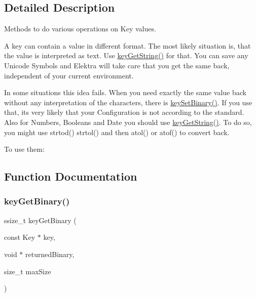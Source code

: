 \subsection{Detailed Description}
Methods to do various operations on Key values. 

A key can contain a value in different format. The most likely situation is, that the value is interpreted as text. Use \mbox{\hyperlink{group__keyvalue_ga41b9fac5ccddafe407fc0ae1e2eb8778}{key\+Get\+String()}} for that. You can save any Unicode Symbols and Elektra will take care that you get the same back, independent of your current environment.

In some situations this idea fails. When you need exactly the same value back without any interpretation of the characters, there is \mbox{\hyperlink{group__keyvalue_gaa50a5358fd328d373a45f395fa1b99e7}{key\+Set\+Binary()}}. If you use that, its very likely that your Configuration is not according to the standard. Also for Numbers, Booleans and Date you should use \mbox{\hyperlink{group__keyvalue_ga41b9fac5ccddafe407fc0ae1e2eb8778}{key\+Get\+String()}}. To do so, you might use strtod() strtol() and then atol() or atof() to convert back.

To use them\+: 
\begin{DoxyCode}{0}
\DoxyCodeLine{\textcolor{preprocessor}{\#include <kdb.h>}}
\end{DoxyCode}
 

\subsection{Function Documentation}
\mbox{\label{group__keyvalue_ga4c0d8a4a11174197699c231e0b5c3c84}} 
\subsubsection{\texorpdfstring{keyGetBinary()}{keyGetBinary()}}
{\footnotesize\ttfamily ssize\+\_\+t key\+Get\+Binary (\begin{DoxyParamCaption}\item[{const Key $\ast$}]{key,  }\item[{void $\ast$}]{returned\+Binary,  }\item[{size\+\_\+t}]{max\+Size }\end{DoxyParamCaption})}



